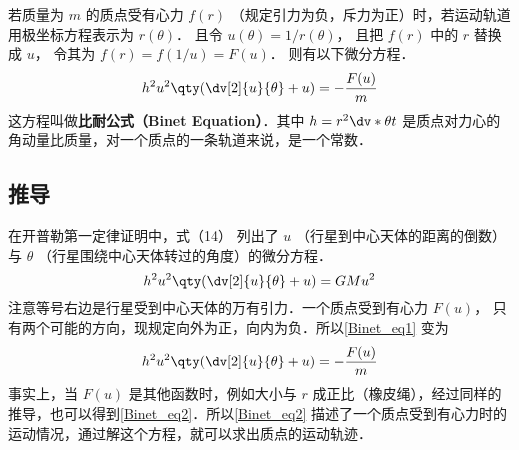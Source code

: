 

若质量为 $m$ 的质点受有心力 $f(r)$ （规定引力为负，斥力为正）时，若运动轨道用极坐标方程表示为 $r(\theta)$． 且令 $u(\theta) = 1/r(\theta)$， 且把 $f(r)$ 中的 $r$ 替换成 $u$， 令其为 $f(r) = f(1/u) = F(u)$． 则有以下微分方程．
\begin{equation}
h^2 u^2 \qty( \dv[2]{u}{\theta} + u ) = -\frac{F(u)}{m}
\end{equation} 
这方程叫做\textbf{比耐公式（Binet Equation）}．其中 $h = r^2 \dv*{\theta}{t}$ 是质点对力心的角动量比质量，对一个质点的一条轨道来说，是一个常数．

\subsection{推导}
在开普勒第一定律证明中，式（14）%
列出了 $u$ （行星到中心天体的距离的倒数）与 $\theta $ （行星围绕中心天体转过的角度）的微分方程． 
\begin{equation}\label{Binet_eq1}
h^2 u^2 \qty( \dv[2]{u}{\theta} + u ) =  GMu^2
\end{equation} 
注意等号右边是行星受到中心天体的万有引力．一个质点受到有心力%
 $F(u)$， 只有两个可能的方向，现规定向外为正，向内为负．所以\autoref{Binet_eq1} 变为
\begin{equation}\label{Binet_eq2}
h^2 u^2 \qty( \dv[2]{u}{\theta} + u ) = -\frac{F(u)}{m}
\end{equation} 
事实上，当 $F(u)$ 是其他函数时，例如大小与 $r$ 成正比（橡皮绳），经过同样的推导，也可以得到\autoref{Binet_eq2}．所以\autoref{Binet_eq2} 描述了一个质点受到有心力时的运动情况，通过解这个方程，就可以求出质点的运动轨迹．














